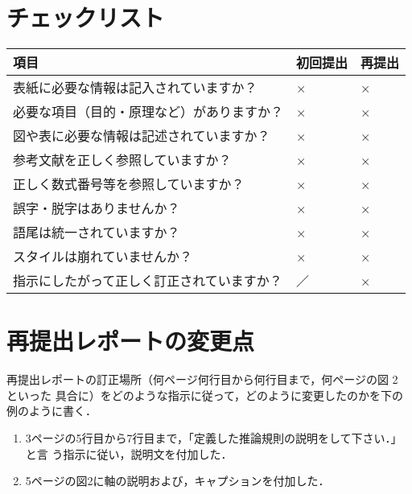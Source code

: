 \documentclass[a4j]{jsarticle}  %
\begin{document}
\section*{チェックリスト}

\begin{tabular}{|l|l|l|} \hline
 項目                                       & 初回提出 & 再提出 \\ \hline
 表紙に必要な情報は記入されていますか？     & ×       & ×     \\ \hline
 必要な項目（目的・原理など）がありますか？ & ×       & ×     \\ \hline
 図や表に必要な情報は記述されていますか？   & ×       & ×     \\ \hline
 参考文献を正しく参照していますか？         & ×       & ×     \\ \hline
 正しく数式番号等を参照していますか？       & ×       & ×     \\ \hline
 誤字・脱字はありませんか？                 & ×       & ×     \\ \hline
 語尾は統一されていますか？                 & ×       & ×     \\ \hline
 スタイルは崩れていませんか？               & ×       & ×     \\ \hline
 指示にしたがって正しく訂正されていますか？ & ／       & ×     \\ \hline
\end{tabular} 

\newpage

\section*{再提出レポートの変更点}
再提出レポートの訂正場所（何ページ何行目から何行目まで，何ページの図 2 といった
具合に）をどのような指示に従って，どのように変更したのかを下の例のように書く．
\begin{enumerate}
 \item 3ページの5行目から7行目まで，「定義した推論規則の説明をして下さい．」と言
       う指示に従い，説明文を付加した．

 \item 5ページの図2に軸の説明および，キャプションを付加した． 
\end{enumerate}
\end{document}

